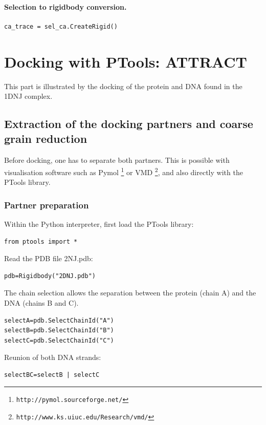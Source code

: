 \documentclass[12pt,a4paper]{article}
\begin{document}
\paragraph{Selection to rigidbody conversion.}
\begin{verbatim}
ca_trace = sel_ca.CreateRigid()
\end{verbatim}



\section{Docking with PTools: ATTRACT}

This part is illustrated by the docking of the protein and DNA found in the 1DNJ complex.

\subsection{Extraction of the docking partners and coarse grain reduction}

Before docking, one has to separate both partners. This is possible with visualisation
software such as Pymol \footnote{\tt http://pymol.sourceforge.net/} or VMD \footnote{\tt http://www.ks.uiuc.edu/Research/vmd/}, and also directly with the PTools library.

\subsubsection{Partner preparation}

Within the Python interpreter, first load the PTools library:
\begin{verbatim}
from ptools import *
\end{verbatim}

Read the PDB file 2NJ.pdb:
\begin{verbatim}
pdb=Rigidbody("2DNJ.pdb")
\end{verbatim}

The chain selection allows the separation between the protein (chain A) and the DNA (chains B and C).
\begin{verbatim}
selectA=pdb.SelectChainId("A")
selectB=pdb.SelectChainId("B")
selectC=pdb.SelectChainId("C")
\end{verbatim}

Reunion of both DNA strands:
\begin{verbatim}
selectBC=selectB | selectC
\end{verbatim}
\end{document}
